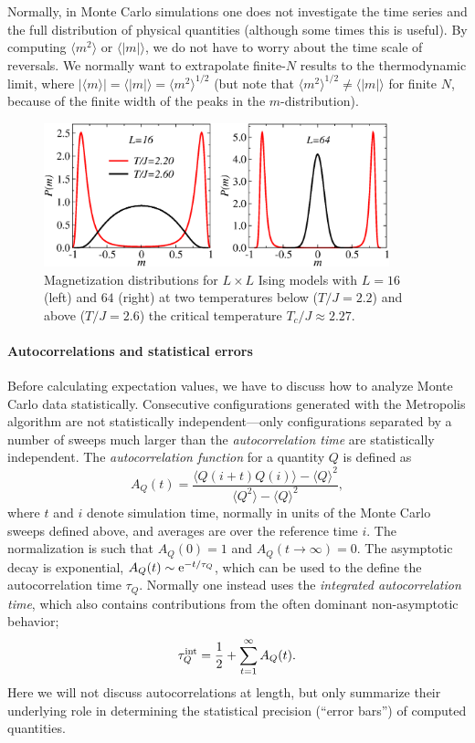 \documentclass[draft,numberedheadings]{aipproc}
\begin{document}
Normally, in Monte Carlo simulations one does not investigate the time series and the full distribution of physical quantities (although some
times this is useful). By computing $\langle m^2\rangle$ or $\langle |m|\rangle$, we do not have to worry about the time scale of reversals. We 
normally want to extrapolate finite-$N$ results to the thermodynamic limit, where $|\langle m\rangle| = \langle |m|\rangle = \langle m^2\rangle^{1/2}$ 
(but note that $\langle m^2\rangle^{1/2}\not=\langle |m|\rangle$ for finite $N$, because of the finite width of the peaks in the $m$-distribution).

\begin{figure}
\includegraphics[width=10cm, clip]{mdist2d.eps}
\caption{Magnetization distributions for $L\times L$ Ising models with $L=16$ (left) and $64$ (right) at two temperatures below 
($T/J=2.2$) and above ($T/J=2.6$) the critical temperature $T_c/J \approx 2.27$.}
\label{mdist2d}
\end{figure}

\paragraph{Autocorrelations and statistical errors}

Before calculating expectation values, we have to discuss how to analyze Monte Carlo data statistically. Consecutive configurations generated with the 
Metropolis algorithm are not statistically independent---only configurations separated by a number of sweeps much larger than the {\it autocorrelation time} 
are statistically independent. The {\it autocorrelation function} for a quantity $Q$ is defined as
\begin{equation}
A_Q(t)=\frac{\langle Q(i+t)Q(i)\rangle - \langle Q\rangle^2}{\langle Q^2\rangle - \langle Q\rangle^2},
\end{equation}
where $t$ and $i$ denote simulation time, normally in units of the Monte Carlo sweeps defined above, and averages are over the reference time $i$. The
normalization is such that $A_Q(0)=1$ and $A_Q(t \to \infty)=0$. The asymptotic decay is exponential, $A_Q(t) \sim {\rm e}^{-t/\tau_Q}$, which can be used 
to the define the autocorrelation time $\tau_Q$. Normally one instead uses the {\it integrated autocorrelation time}, which also contains contributions from 
the often dominant non-asymptotic behavior;
\begin{equation}
\tau^{\rm int}_Q =\frac{1}{2} + \sum_{t=1}^\infty A_Q(t).
\end{equation}
Here we will not discuss autocorrelations at length, but only summarize their underlying role in determining the statistical precision 
(``error bars'') of computed quantities.
\end{document}
